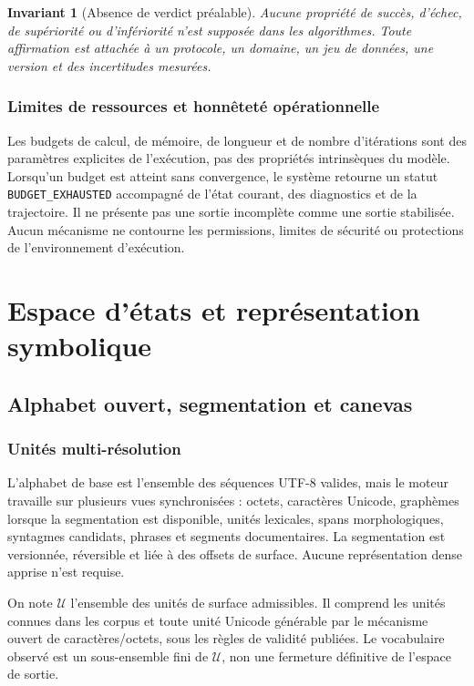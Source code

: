 \documentclass[11pt,a4paper,oneside]{report}
\newtheorem{invariant}[definition]{Invariant}
\begin{document}
\begin{invariant}[Absence de verdict préalable]
Aucune propriété de succès, d'échec, de supériorité ou d'infériorité n'est supposée dans les algorithmes. Toute affirmation est attachée à un protocole, un domaine, un jeu de données, une version et des incertitudes mesurées.
\end{invariant}

\section{Limites de ressources et honnêteté opérationnelle}
Les budgets de calcul, de mémoire, de longueur et de nombre d'itérations sont des paramètres explicites de l'exécution, pas des propriétés intrinsèques du modèle. Lorsqu'un budget est atteint sans convergence, le système retourne un statut \texttt{BUDGET\_EXHAUSTED} accompagné de l'état courant, des diagnostics et de la trajectoire. Il ne présente pas une sortie incomplète comme une sortie stabilisée. Aucun mécanisme ne contourne les permissions, limites de sécurité ou protections de l'environnement d'exécution.

\part{Espace d'états et représentation symbolique}
\chapter{Alphabet ouvert, segmentation et canevas}
\section{Unités multi-résolution}
L'alphabet de base est l'ensemble des séquences UTF-8 valides, mais le moteur travaille sur plusieurs vues synchronisées : octets, caractères Unicode, graphèmes lorsque la segmentation est disponible, unités lexicales, spans morphologiques, syntagmes candidats, phrases et segments documentaires. La segmentation est versionnée, réversible et liée à des offsets de surface. Aucune représentation dense apprise n'est requise.

On note $\mathcal{U}$ l'ensemble des unités de surface admissibles. Il comprend les unités connues dans les corpus et toute unité Unicode générable par le mécanisme ouvert de caractères/octets, sous les règles de validité publiées. Le vocabulaire observé est un sous-ensemble fini de $\mathcal{U}$, non une fermeture définitive de l'espace de sortie.
\end{document}

